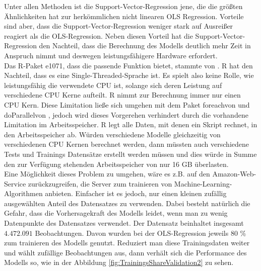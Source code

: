 \documentclass[a4paper,12pt]{thesis}
\begin{document}
Unter allen Methoden ist die Support-Vector-Regression jene, die die größten Ähnlichkeiten hat zur herkömmlichen nicht linearen OLS Regression. Vorteile sind aber, dass die Support-Vector-Regression weniger stark auf Ausreißer reagiert als die OLS-Regression. Neben diesen Vorteil hat die Support-Vector-Regression den Nachteil, dass die Berechnung des Modells deutlich mehr Zeit in Anspruch nimmt und deswegen leistungsfähigere Hardware erfordert.\\
Das R-Paket \glqq e1071\grqq, dass die passende Funktion bietet, stammte von \cite{e10712021}. R hat den Nachteil, dass es eine Single-Threaded-Sprache ist. Es spielt also keine Rolle, wie leistungsfähig die verwendete CPU ist, solange sich deren Leistung auf verschiedene CPU Kerne aufteilt. R nimmt zur Berechnung immer nur einen CPU Kern. Diese Limitation ließe sich umgehen mit dem Paket \glqq foreach\grqq von \cite{foreach} und \glqq doParallel\grqq von \cite{doParallel}, jedoch wird dieses Vorgerehen verhindert durch die vorhandene Limitation im Arbeitsspeicher. R legt alle Daten, mit denen ein Skript rechnet, in den Arbeitsspeicher ab. Würden verschiedene Modelle gleichzeitig von verschiedenen CPU Kernen berechnet werden, dann müssten auch verschiedene Tests und Trainings Datensätze erstellt werden müssen und dies würde in Summe den zur Verfügung stehenden Arbeitsspeicher von nur 16 GB überlasten.\\
Eine Möglichkeit dieses Problem zu umgehen, wäre es z.B. auf den Amazon-Web-Service zurückzugreifen, die Server zum trainieren von Machine-Learning-Algorithmen anbieten. Einfacher ist es jedoch, nur einen kleinen zufällig ausgewählten Anteil des Datensatzes zu verwenden. Dabei besteht natürlich die Gefahr, dass die Vorhersagekraft des Modells leidet, wenn man zu wenig Datenpunkte des Datensatzes verwendet. Der Datensatz beinhaltet insgesamt $4.472.091$ Beobachtungen. Davon wurden bei der OLS-Regression jeweils 80 \% zum trainieren des Modells genutzt. Reduziert man diese Trainingsdaten weiter und wählt zufällige Beobachtungen aus, dann verhält sich die Performance des Modells so, wie in der Abbildung \ref{fig:TrainingsShareValidation2} zu sehen.
\end{document}
